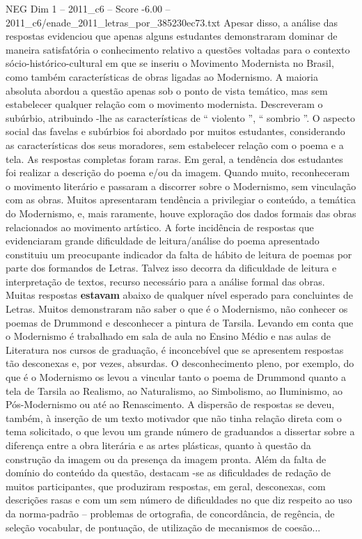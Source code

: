 \begin{textsample}{NEG Dim 1 – 2011\_c6 – Score -6.00 – 2011\_c6/enade\_2011\_letras\_por\_385230ec73.txt}
Apesar disso, a análise das respostas evidenciou que apenas alguns estudantes demonstraram dominar de maneira satisfatória o conhecimento relativo a questões voltadas para o contexto sócio-histórico-cultural em que se inseriu o Movimento Modernista no Brasil, como também características de obras ligadas ao Modernismo.
A maioria absoluta abordou a questão apenas sob o ponto de vista temático, mas sem estabelecer qualquer relação com o movimento modernista.
Descreveram o subúrbio, atribuindo -lhe as características de “ violento ”, “ sombrio ”.
O aspecto social das favelas e subúrbios foi abordado por muitos estudantes, considerando as características dos seus moradores, sem estabelecer relação com o poema e a tela.
As respostas completas foram raras.
Em geral, a tendência dos estudantes foi realizar a descrição do poema e/ou da imagem.
Quando muito, reconheceram o movimento literário e passaram a discorrer sobre o Modernismo, sem vinculação com as obras.
Muitos apresentaram tendência a privilegiar o conteúdo, a temática do Modernismo, e, mais raramente, houve exploração dos dados formais das obras relacionados ao movimento artístico.
A forte incidência de respostas que evidenciaram grande dificuldade de leitura/análise do poema apresentado constituiu um preocupante indicador da falta de hábito de leitura de poemas por parte dos formandos de Letras.
Talvez isso decorra da dificuldade de leitura e interpretação de textos, recurso necessário para a análise formal das obras.
Muitas respostas \textbf{estavam} abaixo de qualquer nível esperado para concluintes de Letras.
Muitos demonstraram não saber o que é o Modernismo, não conhecer os poemas de Drummond e desconhecer a pintura de Tarsila.
Levando em conta que o Modernismo é trabalhado em sala de aula no Ensino Médio e nas aulas de Literatura nos cursos de graduação, é inconcebível que se apresentem respostas tão desconexas e, por vezes, absurdas.
O desconhecimento pleno, por exemplo, do que é o Modernismo os levou a vincular tanto o poema de Drummond quanto a tela de Tarsila ao Realismo, ao Naturalismo, ao Simbolismo, ao Iluminismo, ao Pós-Modernismo ou até ao Renascimento.
A dispersão de respostas se deveu, também, à inserção de um texto motivador que não tinha relação direta com o tema solicitado, o que levou um grande número de graduandos a dissertar sobre a diferença entre a obra literária e as artes plásticas, quanto à questão da construção da imagem ou da presença da imagem pronta.
Além da falta de domínio do conteúdo da questão, destacam -se as dificuldades de redação de muitos participantes, que produziram respostas, em geral, desconexas, com descrições rasas e com um sem número de dificuldades no que diz respeito ao uso da norma-padrão – problemas de ortografia, de concordância, de regência, de seleção vocabular, de pontuação, de utilização de mecanismos de coesão...

\end{textsample}
